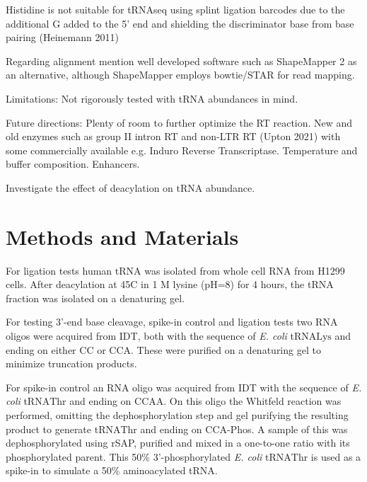 \documentclass[9pt,lineno]{elife}
\begin{document}
Histidine is not suitable for tRNAseq using splint ligation barcodes due to the additional G added to the 5' end and shielding the discriminator base from base pairing (Heinemann 2011)


Regarding alignment mention well developed software such as ShapeMapper 2 as an alternative, although ShapeMapper employs bowtie/STAR for read mapping.



Limitations:
Not rigorously tested with tRNA abundances in mind.



Future directions:
Plenty of room to further optimize the RT reaction.
New and old enzymes such as group II intron RT and non-LTR RT (Upton 2021) with some commercially available e.g. Induro Reverse Transcriptase.
Temperature and buffer composition.
Enhancers.


Investigate the effect of deacylation on tRNA abundance.











\section{Methods and Materials}


For ligation tests human tRNA was isolated from whole cell RNA from H1299 cells.
After deacylation at 45C in 1 M lysine (pH=8) for 4 hours, the tRNA fraction was isolated on a denaturing gel.

For testing 3'-end base cleavage, spike-in control and ligation tests two RNA oligos were acquired from IDT, both with the sequence of \textit{E. coli} tRNA$\text{Lys}$ and ending on either CC or CCA.
These were purified on a denaturing gel to minimize truncation products.

For spike-in control an RNA oligo was acquired from IDT with the sequence of \textit{E. coli} tRNA$\text{Thr}$ and ending on CCAA.
On this oligo the Whitfeld reaction was performed, omitting the dephosphorylation step and gel purifying the resulting product to generate tRNA$\text{Thr}$ and ending on CCA-Phos.
A sample of this was dephosphorylated using rSAP, purified and mixed in a one-to-one ratio with its phosphorylated parent.
This 50\% 3'-phosphorylated \textit{E. coli} tRNA$\text{Thr}$ is used as a spike-in to simulate a 50\% aminoacylated tRNA.
\end{document}
